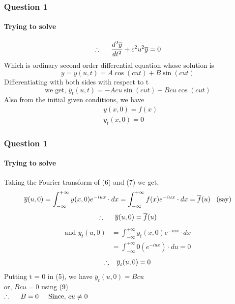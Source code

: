 \documentclass[9 pt]{beamer}
\begin{document}
\begin{frame}[fragile]
\frametitle{Question 1}
\framesubtitle{Trying to solve}
\begin{equation}
\therefore\hspace{0.5cm}\frac{d^2\overline{y}}{dt^2}+c^2u^2\overline{y}=0
\end{equation}
Which is ordinary second order differential equation whose solution is
\begin{equation}
\overline{y}=\overline{y}(u,t)=A\cos (cut) + B\sin (cut)
\end{equation}
Differentiating with both sides with respect to t
\begin{equation}
\textrm{we get, } \overline{y}_t(u,t) = -Acu\sin (cut) + Bcu \cos (cut)
\end{equation}
Also from the initial given conditions, we have
\begin{align}
&y(x,0)=f(x) \\
&y_t(x,0)=0
\end{align}

\transfade[duration=0.6]
\end{frame}

\begin{frame}[fragile]
\frametitle{Question 1}
\framesubtitle{Trying to solve}
Taking the Fourier transform of (6) and (7) we get,
$$\overline{y}(u,0)=\int_{-\infty}^{+\infty}y(x,0)e^{-iux}\cdot dx=\int_{-\infty}^{+\infty}f(x)e^{-iux}\cdot dx=\overline{f}(u)\hspace{0.3cm} \textrm{(say)} $$
\begin{equation}
\therefore\hspace{0.5cm}\overline{y}(u,0)=\overline{f}(u)
\end{equation}
\begin{align*}
\textrm{and } \overline{y}_t(u,0)&=\int_{-\infty}^{+\infty}y_t(x,0)e^{-iux}\cdot dx \\
&=\int_{-\infty}^{+\infty}0(e^{-iux})\cdot du=0
\end{align*}
\begin{equation}
\therefore \hspace{0.3cm}\overline{y}_t(u,0)=0
\end{equation}
Putting t = 0 in (5), we have $\overline{y}_t(u,0)=Bcu$ \\
or, $Bcu=0$ using (9) \\
\hspace{2cm}$\therefore\hspace{0.5cm} B=0 \hspace{0.5cm} \textrm{Since, }cu \neq 0$ \\

\transwipe[duration=0.6]
\end{frame}
\end{document}

